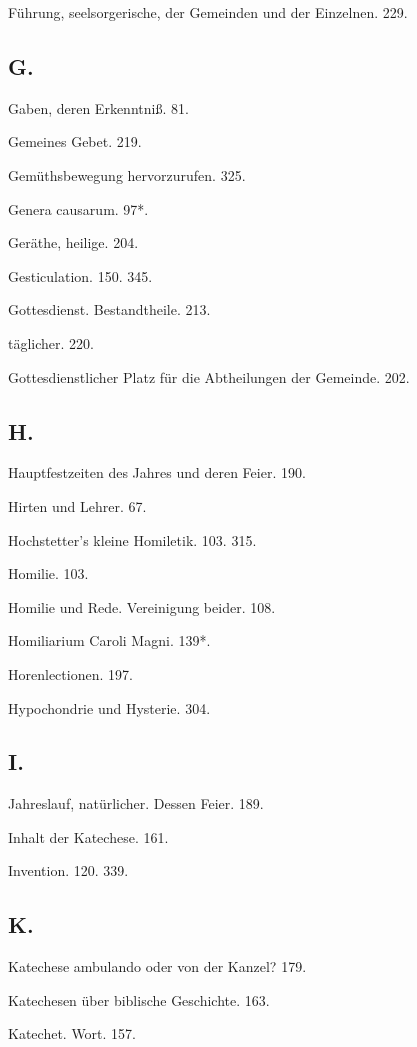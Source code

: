 Führung, seelsorgerische, der Gemeinden und der Einzelnen. 229.

\subsection*{G.}

Gaben, deren Erkenntniß. 81.

Gemeines Gebet. 219.

Gemüthsbewegung hervorzurufen. 325.

Genera causarum. 97*.

Geräthe, heilige. 204.

Gesticulation. 150. 345.

Gottesdienst. Bestandtheile. 213.

täglicher. 220.

Gottesdienstlicher Platz für die Abtheilungen der Gemeinde. 202.

\subsection*{H.}

Hauptfestzeiten des Jahres und deren Feier. 190.

Hirten und Lehrer. 67.

Hochstetter’s kleine Homiletik. 103. 315.

Homilie. 103.

Homilie und Rede. Vereinigung beider. 108.

Homiliarium Caroli Magni. 139*.

Horenlectionen. 197.

Hypochondrie und Hysterie. 304.

\subsection*{I.}

Jahreslauf, natürlicher. Dessen Feier. 189.

Inhalt der Katechese. 161.

Invention. 120. 339.

\subsection*{K.}

Katechese ambulando oder von der Kanzel? 179.

Katechesen über biblische Geschichte. 163.

Katechet. Wort. 157.

